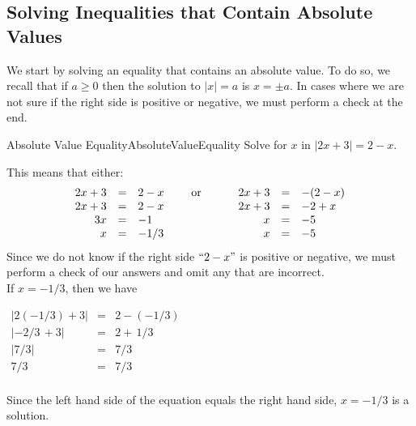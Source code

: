 \subsection{Solving Inequalities that Contain Absolute Values}
We start by solving an equality that contains an absolute value.
To do so, we recall that if $a\geq 0$ then the solution to 
$|x|=a$ is $x=\pm a$. In cases where we are not sure if the right 
side is positive or negative, we must perform a check at the end. \\

\begin{example}{Absolute Value Equality}{AbsoluteValueEquality}
Solve for $x$ in $|2x+3|=2-x$.
\end{example}

\begin{solution} 
This means that either:
\[\begin{array}{rclcrcl}
	2x+3 & = & 2-x & \hspace{5mm} \text{or} \hspace{5mm} & \hspace{3mm} 2x+3 & = & -(2-x)\\
	2x+3 & = & 2-x &  & 2x+3 & = & -2+x\\
	3x & = & -1 &  & x & = & -5\\
	x & = &-1/3 &  & x & = & -5\\
\end{array}\]
Since we do not know if the right side $``2-x"$ is positive or negative, we must perform a check of our answers and omit any that are incorrect.\\

If $x=-1/3$, then we have 

\hspace{4cm} $\begin{array}{rcl}
\displaystyle{\left| 2 (-1/3) +3 \right|} & = & \displaystyle{2-\left( -1/3 \right)} \\
\displaystyle{\left| -2 /3 \, +3\right|} & = & \displaystyle{2+ \, 1/3 } \\
	\displaystyle{ \left| 7 / 3 \right|} & = & \displaystyle{ 7/3 } \\
	\displaystyle{ 7/3 } & = &  \displaystyle{ 7/3 } \\
\end{array} $	
	


Since the left hand side of the equation equals the right hand side, $x=-1/3$ is a solution.\\


\end{solution}
